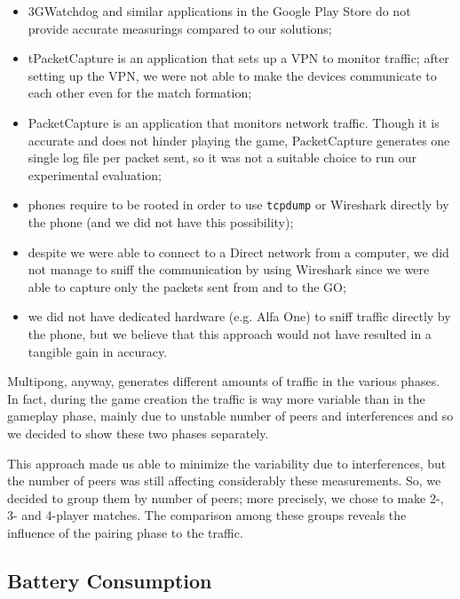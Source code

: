 \begin{itemize}
  \item 3GWatchdog and similar applications in the Google Play Store do not
    provide accurate measurings compared to our solutions;
  \item tPacketCapture is an application that sets up a VPN to monitor traffic;
    after setting up the VPN, we were not able to make the devices communicate
    to each other even for the match formation;
  \item PacketCapture is an application that monitors network traffic. Though
    it is accurate and does not hinder playing the game, PacketCapture
    generates one single log file per packet sent, so it was not a suitable
    choice to run our experimental evaluation;
  \item phones require to be rooted in order to use \texttt{tcpdump} or
    Wireshark directly by the phone (and we did not have this possibility);
  \item despite we were able to connect to a \wifi{} Direct network from a
    computer, we did not manage to sniff the communication by using Wireshark
    since we were able to capture only the packets sent from and to the GO;
  \item we did not have dedicated hardware (e.g. Alfa One) to sniff traffic
    directly by the phone, but we believe that this approach would not have
    resulted in a tangible gain in accuracy.
\end{itemize}

Multipong, anyway, generates different amounts of traffic in the various
phases. In fact, during the game creation the traffic is way more variable than
in the gameplay phase, mainly due to unstable number of peers and \wifi{}
interferences and so we decided to show these two phases separately.

This approach made us able to minimize the variability due to interferences, but the number of peers was still affecting considerably these measurements. So, we decided to group them by number of peers; more precisely, we chose to make 2-, 3- and 4-player matches. The comparison among these groups reveals the influence of the pairing phase to the traffic.

\subsection{Battery Consumption}

